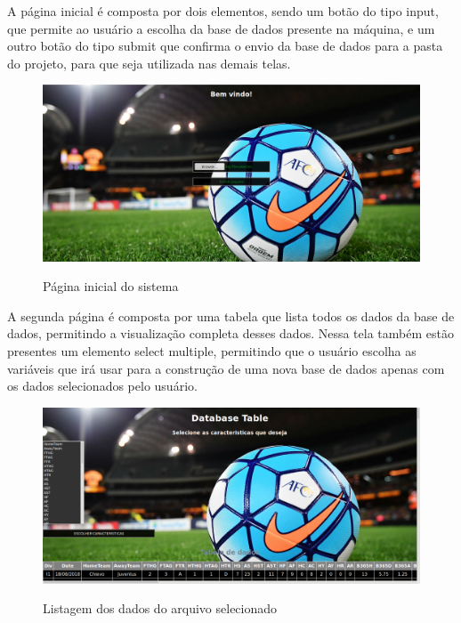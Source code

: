 A página inicial é composta por dois elementos, sendo um botão do tipo input, que permite ao usuário a escolha da base de dados presente na máquina, e um outro botão do tipo submit que confirma o envio da base de dados para a pasta do projeto, para que seja utilizada nas demais telas.

\begin{figure}[htbp]
	\begin{center}
		\includegraphics[width=.9\linewidth]{imagens/home.png}\\
	\end{center}
	\caption[Página inicial do sistema]{Página inicial do sistema}
	\label{fig:logo}
\end{figure}
\newpage
A segunda página é composta por uma tabela que lista todos os dados da base de dados, permitindo a visualização completa desses dados. Nessa tela também estão presentes um elemento select multiple, permitindo que o usuário escolha as variáveis que irá usar para a construção de uma nova base de dados apenas com os dados selecionados pelo usuário.
\begin{figure}[htbp]
	\begin{center}
		\includegraphics[width=.9\linewidth]{imagens/listagem.png}\\
	\end{center}
	\caption[Listagem dos dados do arquivo selecionado]{Listagem dos dados do arquivo selecionado}
	\label{fig:logo}
\end{figure}
